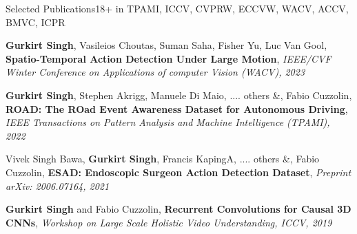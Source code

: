 \documentclass{resume_long} %
\begin{document}
\vspace{0.1in}
\begin{rSection}{Selected Publications}{18+\footnotesize{ in TPAMI, ICCV, CVPRW, ECCVW, WACV, ACCV, BMVC, ICPR}}

\small{\textbf{Gurkirt Singh}, Vasileios Choutas, Suman Saha, Fisher Yu, Luc Van Gool},
\textbf{Spatio-Temporal Action Detection Under Large Motion},
\textit{\small{IEEE/CVF Winter Conference on Applications of computer Vision (WACV), 2023}}

\small{\textbf{Gurkirt Singh}, Stephen Akrigg, Manuele Di Maio, .... others \&,
Fabio Cuzzolin},
\textbf{ROAD: The ROad Event Awareness Dataset for Autonomous Driving},
\textit{\small{IEEE Transactions on Pattern Analysis and Machine Intelligence (TPAMI), 2022}}


\vspace{-0.03in}
\small{Vivek Singh Bawa, \textbf{Gurkirt Singh}, Francis KapingA, .... others \&, 
Fabio Cuzzolin},
\textbf{ESAD: Endoscopic Surgeon Action Detection Dataset},
\textit{\small{Preprint arXiv: 2006.07164, 2021}}




\vspace{-0.03in}
\small{\textbf{Gurkirt Singh} and Fabio Cuzzolin},
\textbf{Recurrent Convolutions for Causal 3D CNNs},
\textit{\small{Workshop on Large Scale Holistic Video Understanding, ICCV, 2019}}


\end{rSection}
\end{document}
